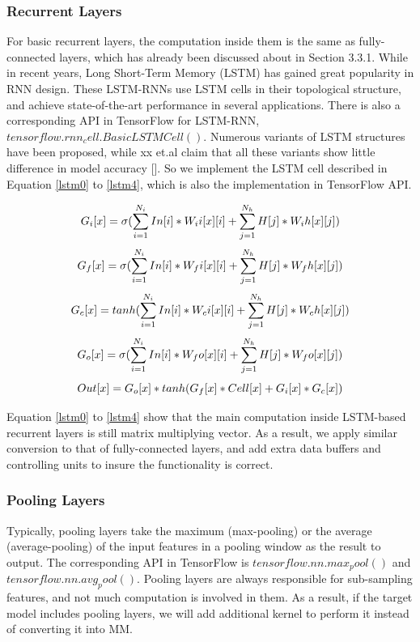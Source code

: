 \documentclass{acm_proc_article-sp-copy}
\begin{document}
\subsubsection{Recurrent Layers}
For basic recurrent layers, the computation inside them is the same as fully-connected layers, which has already been discussed about in Section 3.3.1. While in recent years, Long Short-Term Memory (LSTM) has gained great popularity in RNN design. These LSTM-RNNs use LSTM cells in their topological structure, and achieve state-of-the-art performance in several applications. There is also a corresponding API in TensorFlow for LSTM-RNN, $tensorflow.rnn_cell.BasicLSTMCell()$. Numerous variants of LSTM structures have been proposed, while xx et.al claim that all these variants show little difference in model accuracy []. So we implement the LSTM cell described in Equation \ref{lstm0} to \ref{lstm4}, which is also the implementation in TensorFlow API.

\begin{equation}
\centering
G_i[x]=\sigma(\sum_{i=1}^{N_i}In[i]*W_ii[x][i]+\sum_{j=1}^{N_h}H[j]*W_ih[x][j])
\label{lstm0}
\end{equation}
\begin{equation}
\centering
G_f[x]=\sigma(\sum_{i=1}^{N_i}In[i]*W_fi[x][i]+\sum_{j=1}^{N_h}H[j]*W_fh[x][j])
\label{lstm1}
\end{equation}
\begin{equation}
\centering
G_c[x]=tanh(\sum_{i=1}^{N_i}In[i]*W_ci[x][i]+\sum_{j=1}^{N_h}H[j]*W_ch[x][j])
\label{lstm2}
\end{equation}
\begin{equation}
\centering
G_o[x]=\sigma(\sum_{i=1}^{N_i}In[i]*W_fo[x][i]+\sum_{j=1}^{N_h}H[j]*W_fo[x][j])
\label{lstm3}
\end{equation}
\begin{equation}
\centering
Out[x]=G_o[x]*tanh(G_f[x]*Cell[x]+G_i[x]*G_c[x])
\label{lstm4}
\end{equation}

Equation \ref{lstm0} to \ref{lstm4} show that the main computation inside LSTM-based recurrent layers is still matrix multiplying vector. As a result, we apply similar conversion to that of fully-connected layers, and add extra data buffers and controlling units to insure the functionality is correct.

\subsubsection{Pooling Layers}
Typically, pooling layers take the maximum (max-pooling) or the average (average-pooling) of the input features in a pooling window as the result to output. The corresponding API in TensorFlow is $tensorflow.nn.max_pool()$ and $tensorflow.nn.avg_pool()$. Pooling layers are always responsible for sub-sampling features, and not much computation is involved in them. As a result, if the target model includes pooling layers, we will add additional kernel to perform it instead of converting it into MM. 
\end{document}

